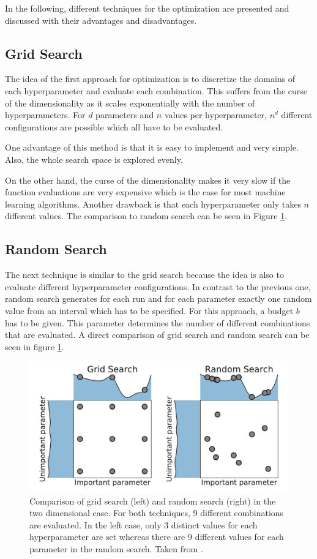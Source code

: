 In the following, different techniques for the optimization are presented and discussed with their advantages and disadvantages.

\subsection{Grid Search}
The idea of the first approach for optimization is to discretize the domains of each hyperparameter and evaluate each combination. This suffers from the curse of the dimensionality as it scales exponentially with the number of hyperparameters. For $ d $ parameters and $ n $ values per hyperparameter, $ n^d $ different configurations are possible which all have to be evaluated. 

One advantage of this method is that it is easy to implement and very simple. Also, the whole search space is explored evenly.

On the other hand, the curse of the dimensionality makes it very slow if the function evaluations are very expensive which is the case for most machine learning algorithms. Another drawback is that each hyperparameter only takes $ n $ different values. The comparison to random search can be seen in Figure \ref{fig:comparison_searches}.


\subsection{Random Search} \label{Random_search}
The next technique \cite{random_search} is similar to the grid search because the idea is also to evaluate different hyperparameter configurations. In contrast to the previous one, random search generates for each run and for each parameter exactly one random value from an interval which has to be specified. For this approach, a budget $ b $ has to be given. This parameter determines the number of different combinations that are evaluated. A direct comparison of grid search and random search can be seen in figure \ref{fig:comparison_searches}.

\begin{figure}[hbtp!]
	\centering
	\includegraphics[scale=0.2]{figures/comparison_searches.png}
	\caption{Comparison of grid search (left) and random search (right) in the two dimensional case. For both techniques, 9 different combinations are evaluated. In the left case, only 3 distinct values for each hyperparameter are set whereas there are 9 different values for each parameter in the random search. Taken from \cite{feurer2019hyperparameter}. }
	\label{fig:comparison_searches}
\end{figure}

